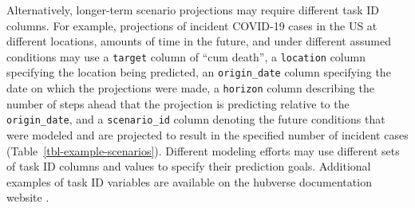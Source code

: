 \documentclass[
  article,
  shortnames,
  notitle]{jss}
\begin{document}
Alternatively, longer-term scenario projections may require different
task ID columns. For example, projections of incident COVID-19 cases in
the US at different locations, amounts of time in the future, and under
different assumed conditions may use a \texttt{target} column of ``cum
death'', a \texttt{location} column specifying the location being
predicted, an \texttt{origin\_date} column specifying the date on which
the projections were made, a \texttt{horizon} column describing the
number of steps ahead that the projection is predicting relative to the
\texttt{origin\_date}, and a \texttt{scenario\_id} column denoting the
future conditions that were modeled and are projected to result in the
specified number of incident cases (Table~\ref{tbl-example-scenarios}).
Different modeling efforts may use different sets of task ID columns and
values to specify their prediction goals. Additional examples of task ID
variables are available on the hubverse documentation website
\citep{hubverse_docs}.
\end{document}
